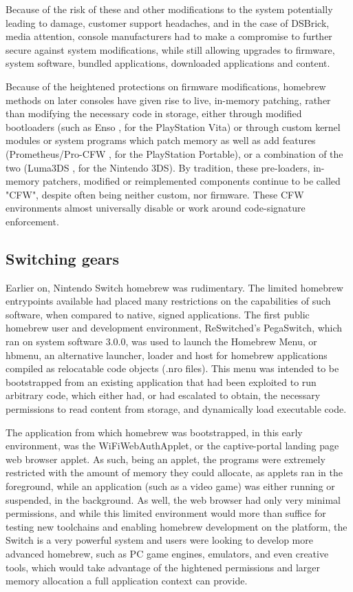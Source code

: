 \documentclass[journal]{IEEEtran}
\begin{document}
Because of the risk of these and other modifications to the system potentially leading to damage,
customer support headaches, and in the case of DSBrick, media attention, console manufacturers
had to make a compromise to further secure against system modifications, while still allowing
upgrades to firmware, system software, bundled applications, downloaded applications and content.

Because of the heightened protections on firmware modifications, homebrew methods on later consoles
have given rise to live, in-memory patching, rather than modifying the necessary code in storage,
either through modified bootloaders (such as Enso \cite{enso}, for the PlayStation Vita) or through custom
kernel modules or system programs which patch memory as well as add features
(Prometheus/Pro-CFW \cite{pro_psp},
for the PlayStation Portable), or a combination of the two (Luma3DS \cite{luma}, for the Nintendo 3DS).
By tradition, these pre-loaders, in-memory patchers, modified or reimplemented components
continue to be called "CFW", despite often being neither custom, nor firmware.
These CFW environments almost universally disable or work around code-signature enforcement.

\subsection{Switching gears}

Earlier on, Nintendo Switch homebrew was rudimentary. The limited homebrew entrypoints available
had placed many restrictions on the capabilities of such software, when compared to native, signed
applications. The first public homebrew user and development environment, ReSwitched's PegaSwitch,
which ran on system software 3.0.0, was used to launch the Homebrew Menu, or hbmenu, an alternative
launcher, loader and host for homebrew applications compiled as relocatable code objects
(.nro files). This menu was intended to be bootstrapped from an existing application that had been
exploited to run arbitrary code, which either had, or had escalated to obtain, the necessary
permissions to read content from storage, and dynamically load executable code.

The application from which homebrew was bootstrapped, in this early environment, was the
WiFiWebAuthApplet, or the captive-portal landing page web browser applet. As such, being an applet,
the programs were extremely restricted with the amount of memory they could allocate, as applets
ran in the foreground, while an application (such as a video game) was either running or suspended,
in the background. As well, the web browser had only very minimal permissions, and while this
limited environment would more than suffice for testing new toolchains and enabling homebrew
development on the platform, the Switch is a very powerful system and users were looking to develop
more advanced homebrew, such as PC game engines, emulators, and even creative tools, which would
take advantage of the hightened permissions and larger memory allocation a full application context
can provide.
\end{document}
